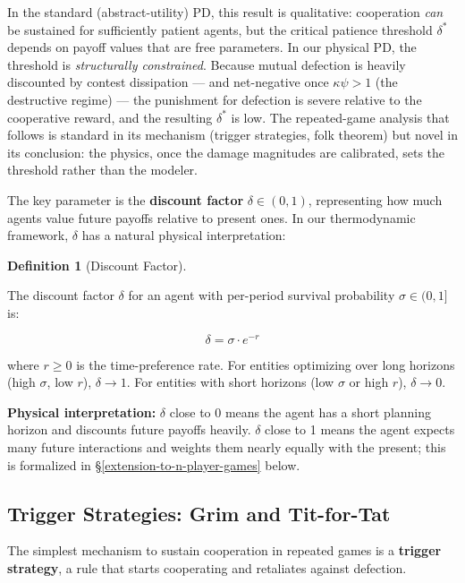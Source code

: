 \documentclass[11pt]{article}
\theoremstyle{plain}
\theoremstyle{definition}
\newtheorem{definition}{Definition}
\theoremstyle{remark}
\let\origsubsection\subsection
\renewcommand{\subsection}{\needspace{7\baselineskip}\origsubsection}
\begin{document}
In the standard (abstract-utility) PD, this result is qualitative:
cooperation \emph{can} be sustained for sufficiently patient agents, but
the critical patience threshold \(\delta^*\) depends on payoff values
that are free parameters. In our physical PD, the threshold is
\emph{structurally constrained}. Because mutual defection is heavily
discounted by contest dissipation --- and net-negative once
\(\kappa\psi > 1\) (the destructive regime) --- the punishment for
defection is severe relative to the cooperative reward, and the
resulting \(\delta^*\) is low. The repeated-game analysis that follows
is standard in its mechanism (trigger strategies, folk theorem) but
novel in its conclusion: the physics, once the damage magnitudes are
calibrated, sets the threshold rather than the modeler.

The key parameter is the \textbf{discount factor} \(\delta \in (0, 1)\),
representing how much agents value future payoffs relative to present
ones. In our thermodynamic framework, \(\delta\) has a natural physical
interpretation:

\begin{definition}[Discount Factor]
\label{def-discount-factor}

The discount factor $\delta$ for an agent with per-period survival probability $\sigma \in (0, 1]$ is:

$$\delta = \sigma \cdot e^{-r}$$

where $r \geq 0$ is the time-preference rate. For entities optimizing over long horizons (high $\sigma$, low $r$), $\delta \to 1$. For entities with short horizons (low $\sigma$ or high $r$), $\delta \to 0$.
\end{definition}

\textbf{Physical interpretation:} \(\delta\) close to 0 means the agent
has a short planning horizon and discounts future payoffs heavily.
\(\delta\) close to 1 means the agent expects many future interactions
and weights them nearly equally with the present; this is formalized in
§\ref{extension-to-n-player-games} below.

\subsection{Trigger Strategies: Grim and
Tit-for-Tat}\label{trigger-strategies-grim-and-tit-for-tat}

The simplest mechanism to sustain cooperation in repeated games is a
\textbf{trigger strategy}, a rule that starts cooperating and retaliates
against defection.
\end{document}
